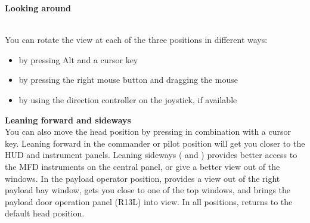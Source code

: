 \noindent
\textbf{Looking around}\\\

\noindent You can rotate the view at each of the three positions in different ways:
\begin{itemize}
\item by pressing Alt and a cursor key
\item by pressing the right mouse button and dragging the mouse
\item by using the direction controller on the joystick, if available 
\end{itemize}
\vspace{0.5cm}
\noindent
\textbf{Leaning forward and sideways}\\

\noindent
You can also move the head position by pressing  in combination with a cursor key. Leaning forward \ks{$\uparrow$} in the commander or pilot position will get you closer to the HUD and instrument panels. Leaning sideways (\ks{$\rightarrow$} and \ks{$\leftarrow$}) provides better access to the MFD instruments on the central panel, or give a better view out of the windows.
In the payload operator position, \ks{$\rightarrow$} provides a view out of the right payload bay window, \ks{$\uparrow$} gets you close to one of the top windows, and \ks{$\leftarrow$} brings the payload door operation panel (R13L) into view.
In all positions, \ks{$\downarrow$} returns to the default head position.

